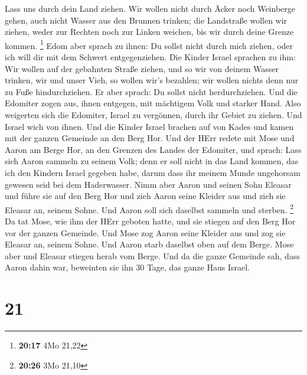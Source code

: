 Lass uns durch dein Land ziehen. Wir wollen nicht durch
Äcker noch Weinberge gehen, auch nicht Wasser aus den Brunnen trinken;
die Landstraße wollen wir ziehen, weder zur Rechten noch zur Linken
weichen, bis wir durch deine Grenze kommen. \footnote{\textbf{20:17} 4Mo
  21,22}  Edom aber sprach zu ihnen: Du sollst nicht
durch mich ziehen, oder ich will dir mit dem Schwert entgegenziehen.
 Die Kinder Israel sprachen zu ihm: Wir wollen auf der
gebahnten Straße ziehen, und so wir von deinem Wasser trinken, wir und
unser Vieh, so wollen wir's bezahlen; wir wollen nichts denn nur zu Fuße
hindurchziehen.  Er aber sprach: Du sollst nicht
herdurchziehen. Und die Edomiter zogen aus, ihnen entgegen, mit
mächtigem Volk und starker Hand.  Also weigerten sich die
Edomiter, Israel zu vergönnen, durch ihr Gebiet zu ziehen. Und Israel
wich von ihnen.  Und die Kinder Israel brachen auf von
Kades und kamen mit der ganzen Gemeinde an den Berg Hor. 
Und der HErr redete mit Mose und Aaron am Berge Hor, an den Grenzen des
Landes der Edomiter, und sprach:  Lass sich Aaron sammeln
zu seinem Volk; denn er soll nicht in das Land kommen, das ich den
Kindern Israel gegeben habe, darum dass ihr meinem Munde ungehorsam
gewesen seid bei dem Haderwasser.  Nimm aber Aaron und
seinen Sohn Eleasar und führe sie auf den Berg Hor  und
zieh Aaron seine Kleider aus und zieh sie Eleasar an, seinem Sohne. Und
Aaron soll sich daselbst sammeln und sterben. \footnote{\textbf{20:26}
  3Mo 21,10}  Da tat Mose, wie ihm der HErr geboten
hatte, und sie stiegen auf den Berg Hor vor der ganzen Gemeinde.
 Und Mose zog Aaron seine Kleider aus und zog sie Eleasar
an, seinem Sohne. Und Aaron starb daselbst oben auf dem Berge. Mose aber
und Eleasar stiegen herab vom Berge.  Und da die ganze
Gemeinde sah, dass Aaron dahin war, beweinten sie ihn 30 Tage, das ganze
Haus Israel.

\hypertarget{section-20}{%
\section{21}\label{section-20}}

